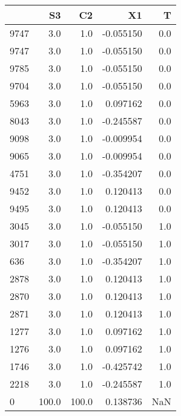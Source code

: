 \begin{tabular}{lrrrr}
\toprule
{} &     S3 &     C2 &        X1 &    T \\
\midrule
9747 &    3.0 &    1.0 & -0.055150 &  0.0 \\
9747 &    3.0 &    1.0 & -0.055150 &  0.0 \\
9785 &    3.0 &    1.0 & -0.055150 &  0.0 \\
9704 &    3.0 &    1.0 & -0.055150 &  0.0 \\
5963 &    3.0 &    1.0 &  0.097162 &  0.0 \\
8043 &    3.0 &    1.0 & -0.245587 &  0.0 \\
9098 &    3.0 &    1.0 & -0.009954 &  0.0 \\
9065 &    3.0 &    1.0 & -0.009954 &  0.0 \\
4751 &    3.0 &    1.0 & -0.354207 &  0.0 \\
9452 &    3.0 &    1.0 &  0.120413 &  0.0 \\
9495 &    3.0 &    1.0 &  0.120413 &  0.0 \\
3045 &    3.0 &    1.0 & -0.055150 &  1.0 \\
3017 &    3.0 &    1.0 & -0.055150 &  1.0 \\
636  &    3.0 &    1.0 & -0.354207 &  1.0 \\
2878 &    3.0 &    1.0 &  0.120413 &  1.0 \\
2870 &    3.0 &    1.0 &  0.120413 &  1.0 \\
2871 &    3.0 &    1.0 &  0.120413 &  1.0 \\
1277 &    3.0 &    1.0 &  0.097162 &  1.0 \\
1276 &    3.0 &    1.0 &  0.097162 &  1.0 \\
1746 &    3.0 &    1.0 & -0.425742 &  1.0 \\
2218 &    3.0 &    1.0 & -0.245587 &  1.0 \\
0    &  100.0 &  100.0 &  0.138736 &  NaN \\
\bottomrule
\end{tabular}
